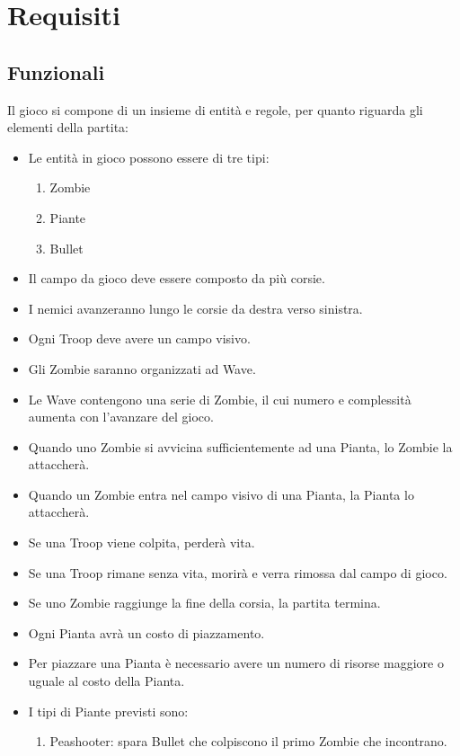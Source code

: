 \section{Requisiti}

\subsection{Funzionali}
Il gioco si compone di un insieme di entità e regole, per quanto riguarda gli elementi della partita:
\begin{itemize}
    \item Le entità in gioco possono essere di tre tipi:
    \begin{enumerate}
        \item Zombie
        \item Piante
        \item Bullet
    \end{enumerate}
    \item Il campo da gioco deve essere composto da più corsie.
    \item I nemici avanzeranno lungo le corsie da destra verso sinistra.
    \item Ogni Troop deve avere un campo visivo.
    \item Gli Zombie saranno organizzati ad Wave.
    \item Le Wave contengono una serie di Zombie, il cui numero e complessità aumenta con l'avanzare del gioco.
    \item Quando uno Zombie si avvicina sufficientemente ad una Pianta, lo Zombie la attaccherà.
    \item Quando un Zombie entra nel campo visivo di una Pianta, la Pianta lo attaccherà.
    \item Se una Troop viene colpita, perderà vita.
    \item Se una Troop rimane senza vita, morirà e verra rimossa dal campo di gioco.
    \item Se uno Zombie raggiunge la fine della corsia, la partita termina.
    \item Ogni Pianta avrà un costo di piazzamento.
    \item Per piazzare una Pianta è necessario avere un numero di risorse maggiore o uguale al costo della Pianta. 
    \item I tipi di Piante previsti sono:
    \begin{enumerate}
        \item Peashooter: spara Bullet che colpiscono il primo Zombie che incontrano.

\end{enumerate}
\end{itemize}
